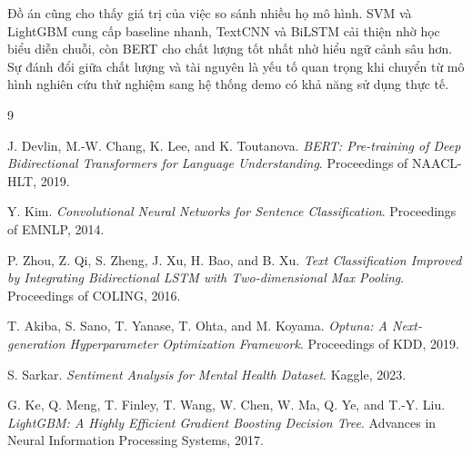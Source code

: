\documentclass[12pt,a4paper,oneside]{report}
\newlength{\manualparindent}
\newcommand{\manualindent}{\hspace*{\manualparindent}}
\begin{document}
\manualindent%
Đồ án cũng cho thấy giá trị của việc so sánh nhiều họ mô hình. SVM và LightGBM cung cấp baseline nhanh, TextCNN và BiLSTM cải thiện nhờ học biểu diễn chuỗi, còn BERT cho chất lượng tốt nhất nhờ hiểu ngữ cảnh sâu hơn. Sự đánh đổi giữa chất lượng và tài nguyên là yếu tố quan trọng khi chuyển từ mô hình nghiên cứu thử nghiệm sang hệ thống demo có khả năng sử dụng thực tế.

\begin{thebibliography}{9}

J. Devlin, M.-W. Chang, K. Lee, and K. Toutanova.
\textit{BERT: Pre-training of Deep Bidirectional Transformers for Language Understanding}.
Proceedings of NAACL-HLT, 2019.

Y. Kim.
\textit{Convolutional Neural Networks for Sentence Classification}.
Proceedings of EMNLP, 2014.

P. Zhou, Z. Qi, S. Zheng, J. Xu, H. Bao, and B. Xu.
\textit{Text Classification Improved by Integrating Bidirectional LSTM with Two-dimensional Max Pooling}.
Proceedings of COLING, 2016.

T. Akiba, S. Sano, T. Yanase, T. Ohta, and M. Koyama.
\textit{Optuna: A Next-generation Hyperparameter Optimization Framework}.
Proceedings of KDD, 2019.

S. Sarkar.
\textit{Sentiment Analysis for Mental Health Dataset}.
Kaggle, 2023.

G. Ke, Q. Meng, T. Finley, T. Wang, W. Chen, W. Ma, Q. Ye, and T.-Y. Liu.
\textit{LightGBM: A Highly Efficient Gradient Boosting Decision Tree}.
Advances in Neural Information Processing Systems, 2017.

\end{thebibliography}
\end{document}
